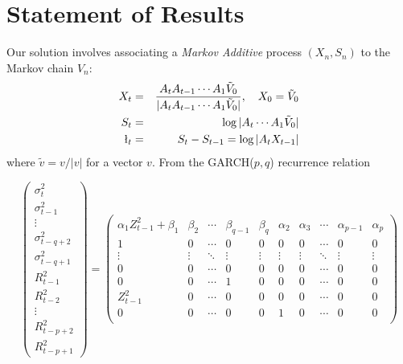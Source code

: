 \section{Statement of Results}
Our solution involves associating a {\em Markov Additive} process
$(X_n, S_n)$ to the Markov chain $V_n$:
\begin{eqnarray}
X_t &=& {
        A_t A_{t-1} \cdots A_1 \tilde V_0
        \over
        |A_t A_{t-1} \cdots A_1 \tilde V_0|
      }, \quad X_0 = \tilde V_0 \label{eq:X_def}\\
S_t &=& \log |A_t \cdots A_1 \tilde V_0| \label{eq:S_def}\\
\l_t &=& S_t - S_{t-1} = \log |A_t X_{t-1}| \label{l_def}
\end{eqnarray}
where $\tilde v = v/|v|$  for a vector $v$. From the GARCH($p, q$)
recurrence relation
\begin{tiny}
  \begin{equation*}
      \begin{pmatrix}
        \sigma_{t}^2 \\
        \sigma_{t-1}^2 \\
        \vdots \\
        \sigma_{t-q+2}^2 \\
        \sigma_{t-q+1}^2 \\
        R_{t-1}^2 \\
        R_{t-2}^2 \\
        \vdots \\
        R_{t-p+2}^2 \\
        R_{t-p+1}^2
      \end{pmatrix}
      =
      \begin{pmatrix}
        \alpha_1 Z_{t-1}^2 + \beta_1 & \beta_2 & \cdots &
        \beta_{q-1} & \beta_q & \alpha_2 & \alpha_3 &
        \cdots & \alpha_{p-1} & \alpha_p\\
        1 & 0 & \cdots & 
        0 & 0 & 0 & 0 & \cdots & 0 & 0 \\
        \vdots & \vdots & \ddots & 
        \vdots & \vdots & \vdots & \vdots &
        \ddots & \vdots & \vdots \\
        0 & 0 & \cdots &
        0 & 0 & 0 & 0 & \cdots & 0 & 0 \\
        0 & 0 & \cdots &
        1 & 0 & 0 & 0 & \cdots & 0 & 0 \\
        Z_{t-1}^2 & 0 & \cdots &
        0 & 0 & 0 & 0 & \cdots & 0 & 0 \\
        0 & 0 & \cdots &
        0 & 0 & 1 & 0 & \cdots & 0 & 0 \\

\end{pmatrix}
\end{equation*}
\end{tiny}
